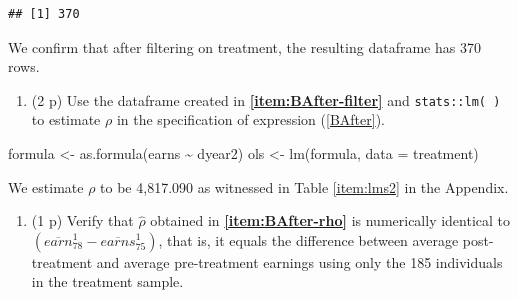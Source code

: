 \documentclass[
]{article}
\newenvironment{Shaded}{\begin{snugshade}}{\end{snugshade}}
\newcommand{\AttributeTok}[1]{\textcolor[rgb]{0.77,0.63,0.00}{#1}}
\newcommand{\DecValTok}[1]{\textcolor[rgb]{0.00,0.00,0.81}{#1}}
\newcommand{\FunctionTok}[1]{\textcolor[rgb]{0.00,0.00,0.00}{#1}}
\newcommand{\NormalTok}[1]{#1}
\newcommand{\OtherTok}[1]{\textcolor[rgb]{0.56,0.35,0.01}{#1}}
\newcommand{\SpecialCharTok}[1]{\textcolor[rgb]{0.00,0.00,0.00}{#1}}
\providecommand{\tightlist}{%
  \setlength{\itemsep}{0pt}\setlength{\parskip}{0pt}}
\begin{document}
\begin{verbatim}
## [1] 370
\end{verbatim}

We confirm that after filtering on treatment, the resulting dataframe
has 370 rows.

\begin{enumerate}
\def\labelenumi{\alph{enumi}.}
\setcounter{enumi}{2}
\tightlist
\item
  (2 p) Use the dataframe created in \textbf{\ref{item:BAfter-filter}}
  and \texttt{stats::lm( )} to estimate \(\rho\) in the specification of
  expression (\ref{BAfter}).\label{item:BAfter-rho}
\end{enumerate}

\begin{Shaded}
\begin{Highlighting}[]
\NormalTok{formula }\OtherTok{\textless{}{-}} \FunctionTok{as.formula}\NormalTok{(earns }\SpecialCharTok{\textasciitilde{}}\NormalTok{ dyear2)}
\NormalTok{ols }\OtherTok{\textless{}{-}} \FunctionTok{lm}\NormalTok{(formula, }\AttributeTok{data =}\NormalTok{ treatment)}
\end{Highlighting}
\end{Shaded}

We estimate \(\rho\) to be 4,817.090 as witnessed in Table
\ref{item:lms2} in the Appendix.

\newpage

\begin{enumerate}
\def\labelenumi{\alph{enumi}.}
\setcounter{enumi}{3}
\tightlist
\item
  (1 p) Verify that \(\hat{\rho}\) obtained in
  \textbf{\ref{item:BAfter-rho}} is numerically identical to
  \(\left( \overline{earn}_{78}^{1}-\overline{earns}_{75}^{1}\right)\),
  that is, it equals the difference between average post-treatment and
  average pre-treatment earnings using only the 185 individuals in the
  treatment sample.\label{item:BAfter-diff}
\end{enumerate}

\begin{Shaded}
\end{Shaded}
\end{document}
